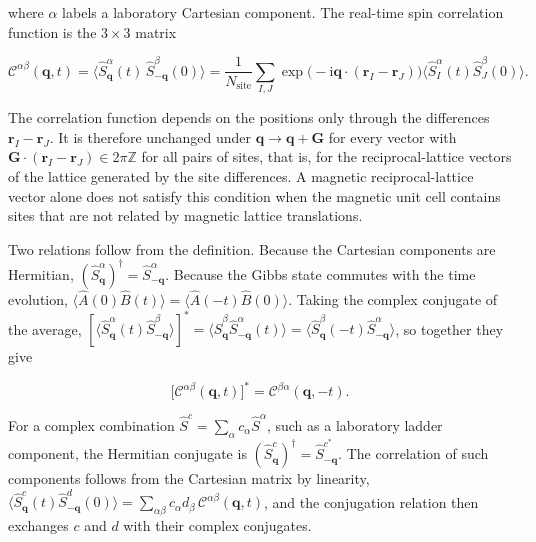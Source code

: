 where \(\alpha\) labels a laboratory Cartesian component. The real-time spin correlation function is the \(3\times3\) matrix

\begin{equation}\label{eq-lswt-spin-correlation-function}
\mathcal C^{\alpha\beta}(\mathbf q,t)
=\big\langle\hat S_{\mathbf q}^\alpha(t)\,\hat S_{-\mathbf q}^\beta(0)\big\rangle
=\frac{1}{N_{\mathrm{site}}}\sum_{I,J}\exp\!\big(-\mathrm i\mathbf q\cdot(\mathbf r_I-\mathbf r_J)\big)\big\langle\hat S_I^\alpha(t)\hat S_J^\beta(0)\big\rangle.
\end{equation}

The correlation function depends on the positions only through the differences \(\mathbf r_I-\mathbf r_J\). It is therefore unchanged under \(\mathbf q\to\mathbf q+\mathbf G\) for every vector with \(\mathbf G\cdot(\mathbf r_I-\mathbf r_J)\in2\pi\mathbb Z\) for all pairs of sites, that is, for the reciprocal-lattice vectors of the lattice generated by the site differences. A magnetic reciprocal-lattice vector alone does not satisfy this condition when the magnetic unit cell contains sites that are not related by magnetic lattice translations.

Two relations follow from the definition. Because the Cartesian components are Hermitian, \((\hat S_{\mathbf q}^\alpha)^\dagger=\hat S_{-\mathbf q}^\alpha\). Because the Gibbs state commutes with the time evolution, \(\langle\hat A(0)\hat B(t)\rangle=\langle\hat A(-t)\hat B(0)\rangle\). Taking the complex conjugate of the average, \([\langle\hat S_{\mathbf q}^\alpha(t)\hat S_{-\mathbf q}^\beta\rangle]^*=\langle\hat S_{\mathbf q}^\beta\hat S_{-\mathbf q}^\alpha(t)\rangle=\langle\hat S_{\mathbf q}^\beta(-t)\hat S_{-\mathbf q}^\alpha\rangle\), so together they give

\begin{equation}\label{eq-lswt-correlation-conjugation}
\big[\mathcal C^{\alpha\beta}(\mathbf q,t)\big]^*=\mathcal C^{\beta\alpha}(\mathbf q,-t).
\end{equation}

For a complex combination \(\hat S^{c}=\sum_\alpha c_\alpha\hat S^\alpha\), such as a laboratory ladder component, the Hermitian conjugate is \((\hat S_{\mathbf q}^{c})^\dagger=\hat S_{-\mathbf q}^{c^*}\). The correlation of such components follows from the Cartesian matrix by linearity, \(\langle\hat S_{\mathbf q}^{c}(t)\hat S_{-\mathbf q}^{d}(0)\rangle=\sum_{\alpha\beta}c_\alpha d_\beta\,\mathcal C^{\alpha\beta}(\mathbf q,t)\), and the conjugation relation then exchanges \(c\) and \(d\) with their complex conjugates.

